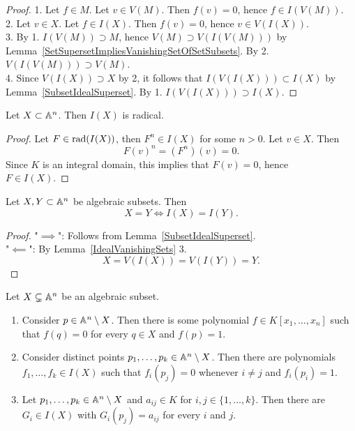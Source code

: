 \begin{proof}
    1. Let $f\in M$. Let $v\in V(M)$. Then $f(v) = 0$, hence $f\in I(V(M))$.\\
    2. Let $v \in X$. Let $f\in I(X)$. Then $f(v)=0$, hence $v\in V(I(X))$.\\
    3. By 1. $I(V(M)) \supset M$, hence $V(M)\supset V(I(V(M)))$ by Lemma~\ref{SetSupersetImpliesVanishingSetOfSetSubsets}. By 2. $V(I(V(M))) \supset V(M)$.\\
    4. Since $V(I(X))\supset X$ by 2, it follows that $I(V(I(X)))\subset I(X)$ by Lemma~\ref{SubsetIdealSuperset}. By 1. $I(V(I(X)))\supset I(X)$.
\end{proof}
\begin{lemma}
    Let $X\subset \mathbb{A}^n$. Then $I(X)$ is radical. 
\end{lemma}
\begin{proof}
    Let $F\in \mathrm{rad}(I(X))$, then $F^n \in I(X)$ for some $n>0$. Let $v\in X$. Then $$F(v)^n=\left(F^n\right)(v)=0.$$ 
    Since $K$ is an integral domain, this implies that $F(v)=0$, hence\\ $F\in I(X)$.
\end{proof}
\begin{lemma}\label{I(.)IsInjective}
    Let $X,Y\subset \mathbb{A}^n$ be algebraic subsets. Then 
    $$X=Y \iff I(X) = I(Y).$$ 
\end{lemma}
\begin{proof}
    "$\implies$": Follows from Lemma~\ref{SubsetIdealSuperset}.\\
    "$\impliedby$": By Lemma~\ref{IdealVanishingSets} 3. 
    $$X = V(I(X))=V(I(Y))=Y.$$
\end{proof}
\begin{corollary}\label{KroneckerPolynomial}
    Let $X\subsetneq \mathbb{A}^n$ be an algebraic subset.
    \begin{enumerate}
        \item Consider $p\in \mathbb{A}^n\setminus X$. Then there is some polynomial $f\in K[x_1,\dots,x_n]$ such that $f(q) = 0$ for every $q\in X$ and $f(p)=1$.
        \item Consider distinct points $p_1,\dots,p_k\in \mathbb{A}^n\setminus X$. Then there are polynomials $f_1,\dots,f_k\in I(X)$ such that $f_i(p_j)=0$ whenever $i\neq j$ and $f_i(p_i)=1$.
        \item  Let $p_1,\dots,p_k\in \mathbb{A}^n\setminus X$ and $a_{ij}\in K$ for $i,j\in\{1,\dots,k\}$. Then there are $G_i\in I(X)$ with $G_i(p_j) = a_{ij}$  for every $i$ and $j$. 
    \end{enumerate}
\end{corollary}
